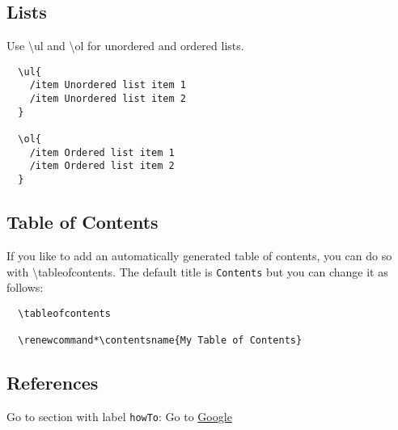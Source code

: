 \documentclass{minutes}
\begin{document}
\subsection{Lists}
Use \textbackslash ul and \textbackslash ol for unordered and ordered lists.

\begin{verbatim}
  \ul{
    /item Unordered list item 1
    /item Unordered list item 2
  }
      
  \ol{
    /item Ordered list item 1
    /item Ordered list item 2
  }
\end{verbatim}   

\subsection{Table of Contents}

If you like to add an automatically generated table of contents, you can do so with \textbackslash tableofcontents. The default title is \texttt{Contents} but you can change it as follows:
      
\begin{verbatim}
  \tableofcontents

  \renewcommand*\contentsname{My Table of Contents}
\end{verbatim}

\subsection{References}
Go to section with label \texttt{howTo}: \pageref{howTo} \newline
Go to \href{https://google.com}{Google}

\newpage

\tasklist
\end{document}
